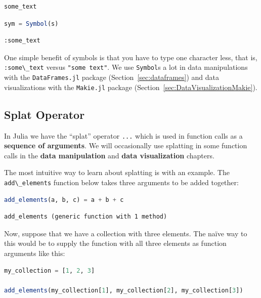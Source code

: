 \documentclass[
  notoc %
]{tufte-book}
\newcommand{\passthrough}[1]{#1}
\begin{document}
\begin{lstlisting}[language=Output]
some_text
\end{lstlisting}

\begin{lstlisting}[language=Julia]
sym = Symbol(s)
\end{lstlisting}

\begin{lstlisting}[language=Output]
:some_text
\end{lstlisting}

One simple benefit of symbols is that you have to type one character
less, that is, \passthrough{\lstinline!:some\_text!} versus
\passthrough{\lstinline!"some text"!}. We use
\passthrough{\lstinline!Symbol!}s a lot in data manipulations with the
\passthrough{\lstinline!DataFrames.jl!} package
(Section~\ref{sec:dataframes}) and data visualizations with the
\passthrough{\lstinline!Makie.jl!} package
(Section~\ref{sec:DataVisualizationMakie}).

\hypertarget{sec:splat}{%
\subsection{Splat Operator}\label{sec:splat}}

In Julia we have the ``splat'' operator \passthrough{\lstinline!...!}
which is used in function calls as a \textbf{sequence of arguments}. We
will occasionally use splatting in some function calls in the
\textbf{data manipulation} and \textbf{data visualization} chapters.

The most intuitive way to learn about splatting is with an example. The
\passthrough{\lstinline!add\_elements!} function below takes three
arguments to be added together:

\begin{lstlisting}[language=Julia]
add_elements(a, b, c) = a + b + c
\end{lstlisting}

\begin{lstlisting}[language=Output]
add_elements (generic function with 1 method)
\end{lstlisting}

Now, suppose that we have a collection with three elements. The naïve
way to this would be to supply the function with all three elements as
function arguments like this:

\begin{lstlisting}[language=Julia]
my_collection = [1, 2, 3]

add_elements(my_collection[1], my_collection[2], my_collection[3])
\end{lstlisting}
\end{document}
